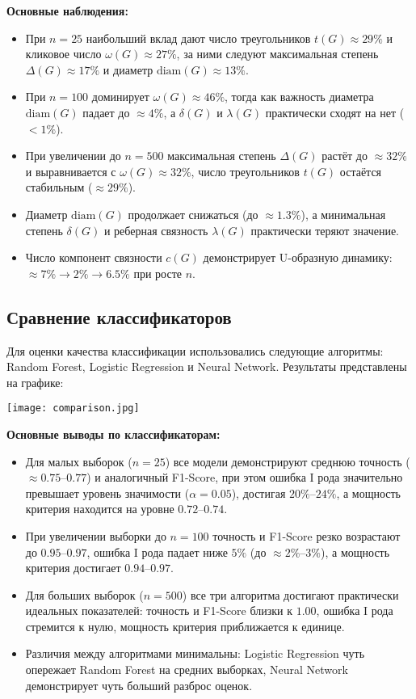 \documentclass[12pt,a4paper]{article}
\begin{document}
\textbf{Основные наблюдения:}
\begin{itemize}
    \item При $n=25$ наибольший вклад дают число треугольников $t(G)\approx29\%$ и кликовое число $\omega(G)\approx27\%$, за ними следуют максимальная степень $\Delta(G)\approx17\%$ и диаметр $\mathrm{diam}(G)\approx13\%$.
    \item При $n=100$ доминирует $\omega(G)\approx46\%$, тогда как важность диаметра $\mathrm{diam}(G)$ падает до $\approx4\%$, а $\delta(G)$ и $\lambda(G)$ практически сходят на нет ($<1\%$).
    \item При увеличении до $n=500$ максимальная степень $\Delta(G)$ растёт до $\approx32\%$ и выравнивается с $\omega(G)\approx32\%$, число треугольников $t(G)$ остаётся стабильным ($\approx29\%$).
    \item Диаметр $\mathrm{diam}(G)$ продолжает снижаться (до $\approx1.3\%$), а минимальная степень $\delta(G)$ и реберная связность $\lambda(G)$ практически теряют значение.
    \item Число компонент связности $c(G)$ демонстрирует U-образную динамику: $\approx7\%\to2\%\to6.5\%$ при росте $n$.
\end{itemize}


   
\subsection{Сравнение классификаторов}

Для оценки качества классификации использовались следующие алгоритмы: Random Forest, Logistic Regression и Neural Network. Результаты представлены на графике:

\texttt{[image: comparison.jpg]}

\textbf{Основные выводы по классификаторам:}
\begin{itemize}
    \item Для малых выборок ($n=25$) все модели демонстрируют среднюю точность ($\approx0.75$–$0.77$) и аналогичный F1-Score, при этом ошибка I рода значительно превышает уровень значимости ($\alpha=0.05$), достигая $20\%$–$24\%$, а мощность критерия находится на уровне $0.72$–$0.74$.
    \item При увеличении выборки до $n=100$ точность и F1-Score резко возрастают до $0.95$–$0.97$, ошибка I рода падает ниже $5\%$ (до $\approx2\%$–$3\%$), а мощность критерия достигает $0.94$–$0.97$.
    \item Для больших выборок ($n=500$) все три алгоритма достигают практически идеальных показателей: точность и F1-Score близки к $1.00$, ошибка I рода стремится к нулю, мощность критерия приближается к единице.
    \item Различия между алгоритмами минимальны: Logistic Regression чуть опережает Random Forest на средних выборках, Neural Network демонстрирует чуть больший разброс оценок.
\end{itemize}
\end{document}
